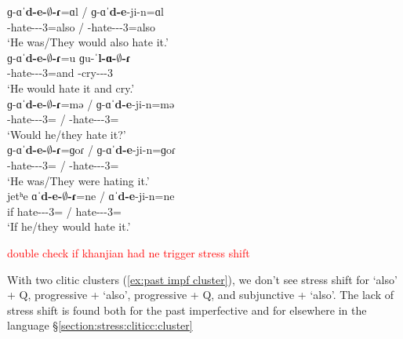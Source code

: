 \begin{exe}
	\ex \label{ex:past impf cl}
	\begin{xlist}
		\ex \gll ɡ-ɑˈ\textbf{d-e-$\emptyset$-ɾ}=ɑl  / ɡ-ɑˈ\textbf{d-e}-ji-n=ɑl 
		\\
		{\ind}-hate-{\thgloss}-{\pst}-3{\sg}=also / {\ind}-hate-{\thgloss}-{\pst}-3{\pl}=also
		\\ \trans `He was/They would also hate it.' 
		\\ 
		\ex \gll ɡ-ɑˈ\textbf{d-e-$\emptyset$-ɾ}=u  ɡu-ˈ\textbf{l-ɑ-$\emptyset$-ɾ} 
		\\
		{\ind}-hate-{\thgloss}-{\pst}-3{\sg}=and {\ind}-cry-{\thgloss}-{\pst}-3{\sg}  
		\\ \trans `He would hate it and cry.'  
		\\ 
		\ex \gll ɡ-ɑˈ\textbf{d-e-$\emptyset$-ɾ}=mə  / ɡ-ɑˈ\textbf{d-e}-ji-n=mə 
		\\
		{\ind}-hate-{\thgloss}-{\pst}-3{\sg}={\q} / {\ind}-hate-{\thgloss}-{\pst}-3{\pl}={\q}
		\\ \trans `Would he/they hate it?'
		\\ 
		\ex \gll ɡ-ɑˈ\textbf{d-e-$\emptyset$-ɾ}=ɡoɾ  / ɡ-ɑˈ\textbf{d-e}-ji-n=ɡoɾ 
		\\
		{\ind}-hate-{\thgloss}-{\pst}-3{\sg}={\prog} / {\ind}-hate-{\thgloss}-{\pst}-3{\pl}={\prog}
		\\ \trans `He was/They were hating it.' 
		\\ 
		\ex \gll jetʰe ɑˈ\textbf{d-e-$\emptyset$-ɾ}=ne  /  ɑˈ\textbf{d-e}-ji-n=ne 
		\\
		if hate-{\thgloss}-{\pst}-3{\sg}={\sbjv} /  hate-{\thgloss}-{\pst}-3{\pl}={\sbjv}
		\\ \trans `If he/they would hate it.' 
		\\ 
	\end{xlist}
\end{exe}


\textcolor{red}{double check if khanjian had ne trigger stress shift}

With two clitic clusters (\ref{ex:past impf cluster}), we don't see stress shift for `also' + Q, progressive + `also', progressive + Q, and subjunctive + `also'. The lack of stress shift is found both for the past imperfective and for elsewhere in the language \S\ref{section:stress:cliticc:cluster}


